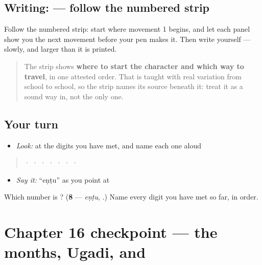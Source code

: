 \subsection*{Writing:  — follow the numbered strip}

Follow the numbered strip: start where movement 1 begins, and let each panel show you the next movement before your pen makes it. Then write  yourself — slowly, and larger than it is printed.

\begin{quote}
The strip shows \textbf{where to start the character and which way to travel}, in one attested order. That is taught with real variation from school to school, so the strip names its source beneath it: treat it as a sound way in, not the only one.
\end{quote}

\subsection*{Your turn}
\begin{itemize}
\raggedright
  \item \emph{Look:} at the digits you have met, and name each one aloud
\end{itemize}

\begin{quote}
  ·    ·    ·    ·    ·    ·    ·  
\end{quote}

\begin{itemize}
\raggedright
  \item \emph{Say it:} \textquotedblleft{}eṇṭu\textquotedblright{} as you point at 
\end{itemize}

\begin{tcolorbox}[breakable,colback=teal!4,colframe=teal!35!black,title={Before you move on}]
Which number is \textbf{}? (\textbf{8} — \emph{eṇṭu}, .) Name every digit you have met so far, in order.
\end{tcolorbox}
\section[Practice]{Chapter 16 checkpoint — the months, Ugadi,  and }

\label{lesson:KA-C16-checkpoint}



